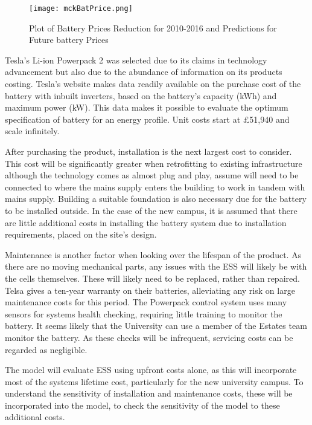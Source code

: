 \begin{figure}[H]
  \centering
  \texttt{[image: mckBatPrice.png]}
  \caption{Plot of Battery Prices Reduction for 2010-2016 and Predictions for Future battery Prices \cite{mckBat}}
  \label{mckBatPrice}
\end{figure}

Tesla's Li-ion Powerpack 2 was selected due to its claims in technology
advancement but also due to the abundance of information on its products
costing. Tesla's website makes data readily available on the purchase
cost of the battery with inbuilt inverters, based on the battery's
capacity (kWh) and maximum power (kW). This data makes it possible to
evaluate the optimum specification of battery for an energy profile.
Unit costs start at £51,940 and scale infinitely.

After purchasing the product, installation is the next largest cost to
consider. This cost will be significantly greater when retrofitting to
existing infrastructure although the technology comes as almost plug and
play, assume will need to be connected to where the mains supply enters
the building to work in tandem with mains supply. Building a suitable
foundation is also necessary due for the battery to be installed
outside. In the case of the new campus, it is assumed that there are
little additional costs in installing the battery system due to
installation requirements, placed on the site's design.

Maintenance is another factor when looking over the lifespan of the
product. As there are no moving mechanical parts, any issues with the
ESS will likely be with the cells themselves. These will likely need to
be replaced, rather than repaired. Telsa gives a ten-year warranty on
their batteries, alleviating any risk on large maintenance costs for
this period. The Powerpack control system uses many sensors for systems
health checking, requiring little training to monitor the battery. It
seems likely that the University can use a member of the Estates team
monitor the battery. As these checks will be infrequent, servicing costs
can be regarded as negligible.

The model will evaluate ESS using upfront costs alone, as this will
incorporate most of the systems lifetime cost, particularly for the new
university campus. To understand the sensitivity of installation and
maintenance costs, these will be incorporated into the model, to check
the sensitivity of the model to these additional costs.

